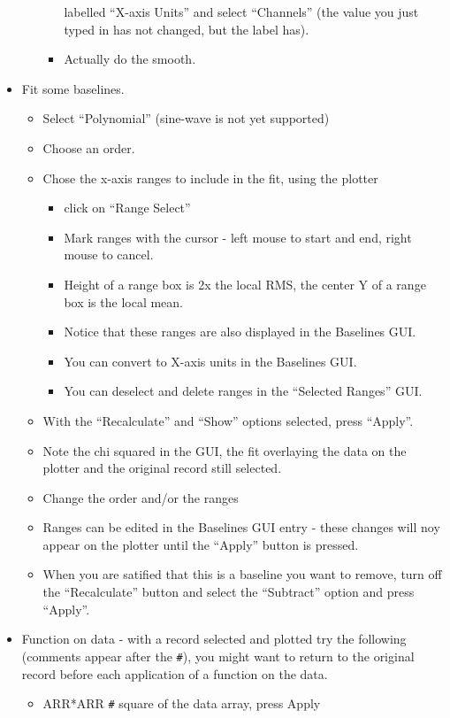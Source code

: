 \begin{itemize}
\begin{itemize}
\begin{itemize}
labelled ``X-axis Units'' and select ``Channels'' (the value you just
typed in has not changed, but the label has).
\item Actually do the smooth.
\end{itemize}
\end{itemize}
\item Fit some baselines.
\begin{itemize}
\item Select ``Polynomial'' (sine-wave is not yet supported)
\item Choose an order.
\item Chose the x-axis ranges to include in the fit, using the plotter
\begin{itemize}
\item click on ``Range Select''
\item Mark ranges with the cursor - left mouse to start and end, right
mouse to cancel.
\item Height of a range box is 2x the local RMS, the center Y of a 
range box is the local mean.
\item Notice that these ranges are also displayed in the Baselines GUI.
\item You can convert to X-axis units in the Baselines GUI.
\item You can deselect and delete ranges in the ``Selected Ranges'' GUI.
\end{itemize}
\item With the ``Recalculate'' and ``Show'' options selected, press ``Apply''.
\item Note the chi squared in the GUI, the fit overlaying the data on the 
plotter and the original record still selected.
\item Change the order and/or the ranges
\item Ranges can be edited in the Baselines GUI entry - these changes will
noy appear on the plotter until the ``Apply'' button is pressed.
\item When you are satified that this is a baseline you want to remove,
turn off the ``Recalculate'' button and select the ``Subtract'' option
and press ``Apply''.
\end{itemize}
\item Function on data - with a record selected and plotted try the following
(comments appear after the \verb_#_), you might want to return to the original
record before each application of a function on the data.
\begin{itemize}
\item ARR*ARR  \verb_#_ square of the data array, press Apply

\end{itemize}
\end{itemize}
